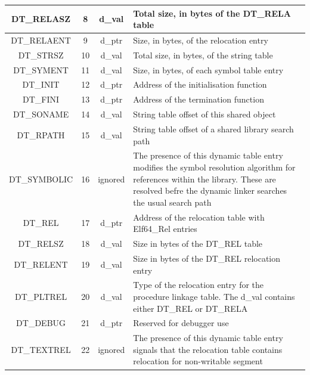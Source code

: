 \begin{itemize}
\begin{table}[!htbp]
\begin{center}
\begin{tabular}{|c|c|c|p{10cm}|}
                \hline {\ttfamily DT\_RELASZ} & 8 & {\ttfamily d\_val} & Total size, in bytes of the {\ttfamily DT\_RELA} table\\
                \hline {\ttfamily DT\_RELAENT} & 9 & {\ttfamily d\_ptr} & Size, in bytes, of the relocation entry\\ \hline {\ttfamily DT\_STRSZ} & 10 & {\ttfamily d\_val} & Total size, in bytes, of the string table\\ \hline {\ttfamily DT\_SYMENT} & 11 & {\ttfamily d\_val} & Size, in bytes, of each symbol table entry\\ \hline {\ttfamily DT\_INIT} & 12 & {\ttfamily d\_ptr} & Address of the initialisation function\\
                \hline {\ttfamily DT\_FINI} & 13 & {\ttfamily d\_ptr} & Address of the termination function\\
                \hline {\ttfamily DT\_SONAME} & 14 & {\ttfamily d\_val} & String table offset of this shared object\\
                \hline {\ttfamily DT\_RPATH} & 15 & {\ttfamily d\_val} & String table offset of a shared library search path\\
                \hline {\ttfamily DT\_SYMBOLIC} & 16 & {\ttfamily ignored} & The presence of this dynamic table entry modifies the symbol resolution algorithm for references within the library. These are resolved befre the dynamic linker searches the usual search path\\
                \hline {\ttfamily DT\_REL} & 17 & {\ttfamily d\_ptr} & Address of the relocation table with {\ttfamily Elf64\_Rel} entries\\
                \hline {\ttfamily DT\_RELSZ} & 18 & {\ttfamily d\_val} & Size in bytes of the {\ttfamily DT\_REL} table\\
                \hline {\ttfamily DT\_RELENT} & 19 & {\ttfamily d\_val} & Size in bytes of the {\ttfamily DT\_REL} relocation entry\\
                \hline {\ttfamily DT\_PLTREL} & 20 & {\ttfamily d\_val} & Type of the relocation entry for the procedure linkage table. The {\ttfamily d\_val} contains either {\ttfamily DT\_REL} or {\ttfamily DT\_RELA}\\
                \hline {\ttfamily DT\_DEBUG} & 21 & {\ttfamily d\_ptr} & Reserved for debugger use\\
                \hline {\ttfamily DT\_TEXTREL} & 22 & {\ttfamily ignored} & The presence of this dynamic table entry signals that the relocation table contains relocation for non-writable segment\\

\end{tabular}
\end{center}
\end{table}
\end{itemize}
